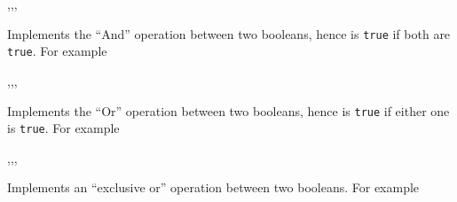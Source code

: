 \documentclass[oneside]{book}
\begin{document}
\begin{function}{\boolVarAnd,\boolVarAndT,\boolVarAndF,\boolVarAndTF}
\begin{syntax}
  
   
   
    
\end{syntax}
Implements the \enquote{And} operation between two booleans,
hence is \texttt{true} if both are \texttt{true}.
For example
\begin{demohigh}
 {} {} {}
\end{demohigh}
\end{function}

\begin{function}{\boolVarOr,\boolVarOrT,\boolVarOrF,\boolVarOrTF}
\begin{syntax}
  
   
   
    
\end{syntax}
Implements the \enquote{Or} operation between two booleans,
hence is \texttt{true} if either one is \texttt{true}.
For example
\begin{demohigh}
 {} {} {}
\end{demohigh}
\end{function}

\begin{function}{\boolVarXor,\boolVarXorT,\boolVarXorF,\boolVarXorTF}
\begin{syntax}
  
   
   
    
\end{syntax}
Implements an \enquote{exclusive or} operation between two booleans.
For example
\begin{demohigh}
 {} {} {}
\end{demohigh}
\end{function}
\end{document}
